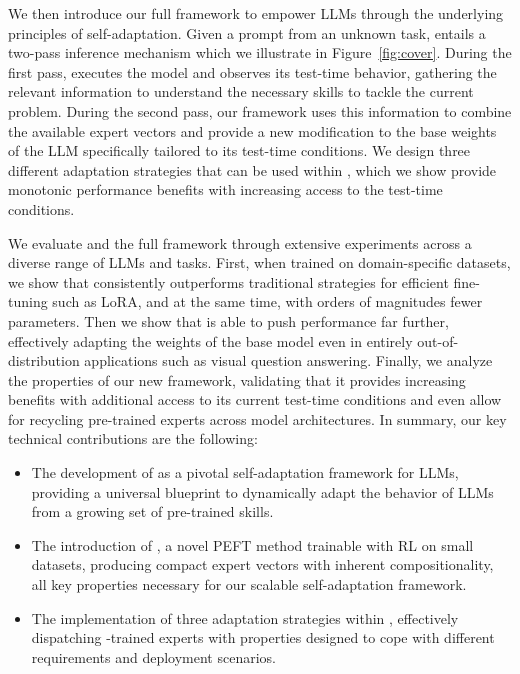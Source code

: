 We then introduce our full \implname framework to empower LLMs through the underlying principles of self-adaptation.
Given a prompt from an unknown task, \implname entails a two-pass inference mechanism which we illustrate in Figure~\ref{fig:cover}.
During the first pass, \implname executes the model and observes its test-time behavior, gathering the relevant information to understand the necessary skills to tackle the current problem.
During the second pass, our framework uses this information to combine the available expert vectors and provide a new modification to the base weights of the LLM specifically tailored to its test-time conditions. 
We design three different adaptation strategies that can be used within \implname, which we show provide monotonic performance benefits with increasing access to the test-time conditions.

We evaluate \svdacro and the full \implname framework through extensive experiments across a diverse range of LLMs and tasks.
First, when trained on domain-specific datasets, we show that \svdacro consistently outperforms traditional strategies for efficient fine-tuning such as LoRA, and at the same time, with orders of magnitudes fewer parameters.
Then we show that \implname is able to push performance far further, effectively adapting the weights of the base model even in entirely out-of-distribution applications such as visual question answering.
Finally, we analyze the properties of our new framework, validating that it provides increasing benefits with additional access to its current test-time conditions and even allow for recycling pre-trained \svdacro experts across model architectures.
In summary, our key technical contributions are the following: 
\begin{itemize}
\item The development of \implname as a pivotal self-adaptation framework for LLMs, providing a universal blueprint to dynamically adapt the behavior of LLMs from a growing set of pre-trained skills.
\item The introduction of \svdacro, a novel PEFT method trainable with RL on small datasets, producing compact expert vectors with inherent compositionality, all key properties necessary for our scalable self-adaptation framework.
\item The implementation of three adaptation strategies within \implname, effectively dispatching \svdacro-trained experts with properties designed to cope with different requirements and deployment scenarios.
\end{itemize}
